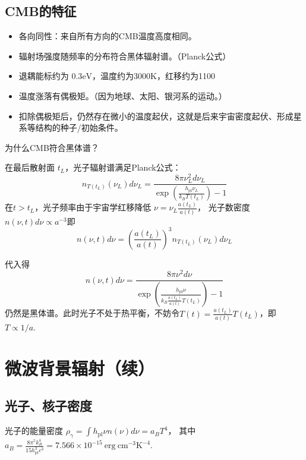 \documentclass[]{ctexart}
\begin{document}
\subsection{CMB的特征}

\begin{itemize}
    \item 各向同性：来自所有方向的CMB温度高度相同。
    \item 辐射场强度随频率的分布符合黑体辐射谱。（Planck公式）
    \item 退耦能标约为 $0.3\mathrm{eV}$，温度约为3000K，红移约为1100
    \item 温度涨落有偶极矩。（因为地球、太阳、银河系的运动。）
    \item 扣除偶极矩后，仍然存在微小的温度起伏，这就是后来宇宙密度起伏、形成星系等结构的种子/初始条件。
\end{itemize}

为什么CMB符合黑体谱？

在最后散射面 $t_L$，光子辐射谱满足Planck公式：
\begin{equation}
    n_{T(t_L)}(\nu_L) d \nu_L=\frac{8 \pi \nu_L^{2} d \nu_L}{\exp \left(\frac{h_\text{pl} \nu_L}{k_{B} T(t_L)} \right)-1}
\end{equation}
在$t>t_L$，光子频率由于宇宙学红移降低 $\nu=\nu_{L} \frac{a(t_L)}{a(t)}$，
光子数密度 $n\left(\nu, t\right) d\nu \propto a^{-3}$即
\begin{equation}
    n(\nu, t) d \nu=\left(\frac{a(t_L)}{a(t)}\right)^{3} n_{T\left(t_{L}\right)}\left(\nu_{L}\right) d \nu_{L}
\end{equation}

代入得
\begin{equation}
    n(\nu, t) d \nu = \frac{8 \pi \nu^{2} d \nu}{\exp \left(\frac{h_\text{pl} \nu}{k_{B} \frac{a(t_L)}{a(t)}T(t_L)}   \right)-1}
\end{equation}
仍然是黑体谱。此时光子不处于热平衡，不妨令$T(t)=\frac{a(t_L)}{a(t)}T(t_L)$，即$T\propto 1/a$.

\section*{微波背景辐射（续）}

\subsection*{光子、核子密度}

光子的能量密度 $\rho_\gamma = \int h_{\mathrm{pl}} \nu n(\nu) d\nu = a_B T^4$， 其中 $a_B=\frac{8\pi^5 k_B^4}{15 h_{\mathrm{pl}}^3 c^3 } = 7.566\times 10^{-15} \mathrm{~erg~cm^{-3}K^{-4}}$.
\end{document}
